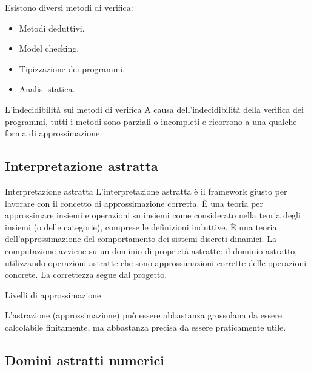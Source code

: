 Esistono diversi metodi di verifica:
\begin{itemize}
    \item Metodi deduttivi.
    \item Model checking.
    \item Tipizzazione dei programmi.
    \item Analisi statica.
\end{itemize}

\begin{nota}{L'indecidibilità sui metodi di verifica}{}
A causa dell'indecidibilità della verifica dei programmi, tutti i metodi
sono parziali o incompleti e ricorrono a una qualche forma di
approssimazione.
\end{nota}

\subsection{Interpretazione astratta}

\begin{definizione}{Interpretazione astratta}{}
L'interpretazione astratta è il framework giusto per lavorare con il concetto
di approssimazione corretta.
È una teoria per approssimare insiemi e operazioni su insiemi come
considerato nella teoria degli insiemi (o delle categorie), comprese le
definizioni induttive.
È una teoria dell'approssimazione del comportamento dei sistemi discreti
dinamici.
La computazione avviene su un dominio di proprietà astratte: il dominio
astratto, utilizzando operazioni astratte che sono approssimazioni corrette
delle operazioni concrete.
La correttezza segue dal progetto.

\end{definizione}

\begin{nota}{Livelli di approssimazione}{}

L'astrazione (approssimazione) può essere abbastanza grossolana da essere
calcolabile finitamente, ma abbastanza precisa da essere praticamente utile.

\end{nota}

\subsection{Domini astratti numerici}

